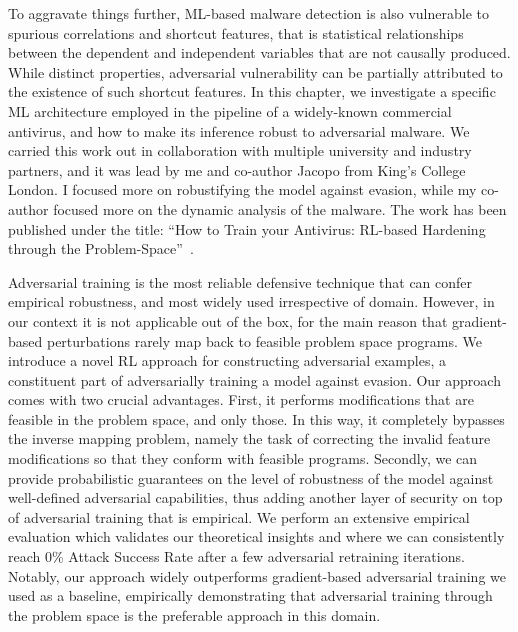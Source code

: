 To aggravate things further, ML-based malware detection is also vulnerable to spurious correlations and shortcut features, that is statistical relationships between the dependent and independent variables that are not causally produced.
While distinct properties, adversarial vulnerability can be partially attributed to the existence of such shortcut features.
In this chapter, we investigate a specific ML architecture employed in the pipeline of a widely-known commercial antivirus, and how to make its inference robust to adversarial malware.
We carried this work out in collaboration with multiple university and industry partners, and it was lead by me and co-author Jacopo from King's College London.
I focused more on robustifying the model against evasion, while my co-author focused more on the dynamic analysis of the malware.
The work has been published under the title: ``How to Train your Antivirus: RL-based Hardening through the Problem-Space''~\cite{tisngenopoulos2024train}.

Adversarial training is the most reliable defensive technique that can confer empirical robustness, and most widely used irrespective of domain. 
However, in our context it is not applicable out of the box, for the main reason that gradient-based perturbations rarely map back to feasible problem space programs. 
We introduce a novel \gls{RL} approach for constructing adversarial examples, a constituent part of adversarially training a model against evasion.
Our approach comes with two crucial advantages.
First, it performs modifications that are feasible in the problem space, and only those.
In this way, it completely bypasses the inverse mapping problem, namely the task of correcting the invalid feature modifications so that they conform with feasible programs.
Secondly, we can provide probabilistic guarantees on the level of robustness of the model against well-defined adversarial capabilities, thus adding another layer of security on top of adversarial training that is empirical.
We perform an extensive empirical evaluation which validates our theoretical insights and where we can consistently reach 0\% Attack Success Rate after a few adversarial retraining iterations.
Notably, our approach widely outperforms gradient-based adversarial training we used as a baseline, empirically demonstrating that adversarial training through the problem space is the preferable approach in this domain.

